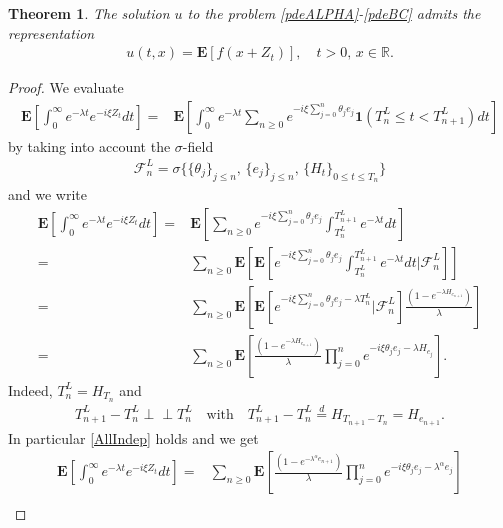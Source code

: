 \documentclass[10pt,a4paper]{article}
\numberwithin{equation}{section}
\newcommand{\indep}{\perp \! \! \! \perp}
\theoremstyle{plain}
\newtheorem{theorem}{Theorem}
\theoremstyle{remark}
\begin{document}
\begin{theorem}
The solution $u$ to the problem \eqref{pdeALPHA}-\eqref{pdeBC} admits the representation 
\begin{align*}
u(t,x)=\mathbf{E}[f(x + Z_t)], \quad t>0,\, x \in \mathbb{R}.
\end{align*}
\label{thm:Zpde}
\end{theorem}
\begin{proof}
We evaluate
\begin{align*}
\mathbf{E} \left[ \int_0^\infty e^{-\lambda t} e^{-i\xi Z_t} dt \right] 
= & \mathbf{E} \left[ \int_0^\infty e^{-\lambda t} \sum_{n \geq 0} e^{-i \xi \sum_{j=0}^n \theta_j e_j} \mathbf{1}(T^L_n \leq t < T^L_{n+1}) dt \right]
\end{align*}
by taking into account the $\sigma$-field
\begin{align*}
\mathcal{F}^L_{n} = \sigma\bigg\{\{\theta_j\}_{j \leq n},\, \{e_j\}_{j \leq n},\, \{H_t\}_{0 \leq t \leq T_n}\bigg\}
\end{align*}
and we write
\begin{align*}
\mathbf{E} \left[ \int_0^\infty e^{-\lambda t} e^{-i\xi Z_t} dt \right] 
= & \mathbf{E} \left[ \sum_{n \geq 0} e^{-i \xi \sum_{j=0}^n \theta_j e_j} \int_{T^L_n}^{T^L_{n+1}} e^{-\lambda t} dt \right]\\
= & \sum_{n \geq 0} \mathbf{E} \left[ \mathbf{E} \left[  e^{-i \xi \sum_{j=0}^n \theta_j e_j} \int_{T^L_n}^{T^L_{n+1}} e^{-\lambda t} dt \Bigg| \mathcal{F}^L_n \right]  \right]\\
= & \sum_{n \geq 0} \mathbf{E} \left[ \mathbf{E} \left[ e^{-i \xi \sum_{j=0}^n \theta_j e_j - \lambda T^L_n}\Bigg| \mathcal{F}^L_n \right]  \frac{\left(1 - e^{-\lambda H_{e_{n+1}}} \right)}{\lambda}  \right]\\
= & \sum_{n \geq 0} \mathbf{E} \left[ \frac{\left(1 - e^{-\lambda H_{e_{n+1}}} \right)}{\lambda} \prod_{j=0}^n e^{-i \xi \theta_j e_j - \lambda H_{e_j}}   \right].
\end{align*}
Indeed, $T^L_n = H_{T_n}$ and 
\begin{align*}
T^L_{n+1} - T^L_{n} \indep T^L_n \quad \textrm{with} \quad T^L_{n+1} - T^L_{n} \stackrel{d}{=} H_{T_{n+1} - T_n} = H_{e_{n+1}}. 
\end{align*}
In particular \eqref{AllIndep} holds and we get
\begin{align*}
\mathbf{E} \left[ \int_0^\infty e^{-\lambda t} e^{-i\xi Z_t} dt \right] 
= & \sum_{n \geq 0} \mathbf{E} \left[ \frac{\left(1 - e^{-\lambda^\alpha e_{n+1}} \right)}{\lambda} \prod_{j=0}^n e^{-i \xi \theta_j e_j - \lambda^\alpha e_j}   \right]\\

\end{align*}
\end{proof}
\end{document}
